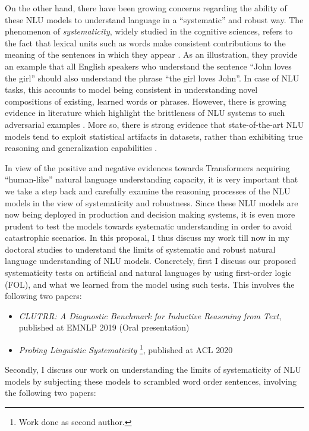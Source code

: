 \documentclass[12pt]{article}
\begin{document}
On the other hand, there have been growing concerns regarding the ability of these NLU models to understand language in a ``systematic'' and robust way. The phenomenon of \textit{systematicity}, widely studied in the cognitive sciences, refers to the fact that lexical units such as words make consistent contributions to the meaning of the sentences in which they appear \CITE[Fodor]. As an illustration, they provide an example that all English speakers who understand the sentence ``John loves the girl'' should also understand the phrase ``the girl loves John''. In case of NLU tasks, this accounts to model being consistent in understanding novel compositions of existing, learned words or phrases. However, there is growing evidence in literature which highlight the brittleness of NLU systems to such adversarial examples \CITE. More so, there is strong evidence that state-of-the-art NLU models tend to exploit statistical artifacts in datasets, rather than exhibiting true reasoning and generalization capabilities \CITE.

In view of the positive and negative evidences towards Transformers acquiring ``human-like'' natural language understanding capacity, it is very important that we take a step back and carefully examine the reasoning processes of the NLU models in the view of systematicity and robustness. Since these NLU models are now being deployed in production and decision making systems, it is even more prudent to test the models towards systematic understanding in order to avoid catastrophic scenarios. In this proposal, I thus discuss my work till now in my doctoral studies to understand the limits of systematic and robust natural language understanding of NLU models. Concretely, first I discuss our proposed systematicity tests on artificial and natural languages by using first-order logic (FOL), and what we learned from the model using such tests. This involves the following two papers:

\begin{itemize}
  \item \textit{CLUTRR: A Diagnostic Benchmark for Inductive Reasoning from Text}, published at EMNLP 2019 (Oral presentation)
  \item \textit{Probing Linguistic Systematicity} \footnote{Work done as second author.}, published at ACL 2020
\end{itemize}

Secondly, I discuss our work on understanding the limits of systematicity of NLU models by subjecting these models to scrambled word order sentences, involving the following two papers:
\end{document}
